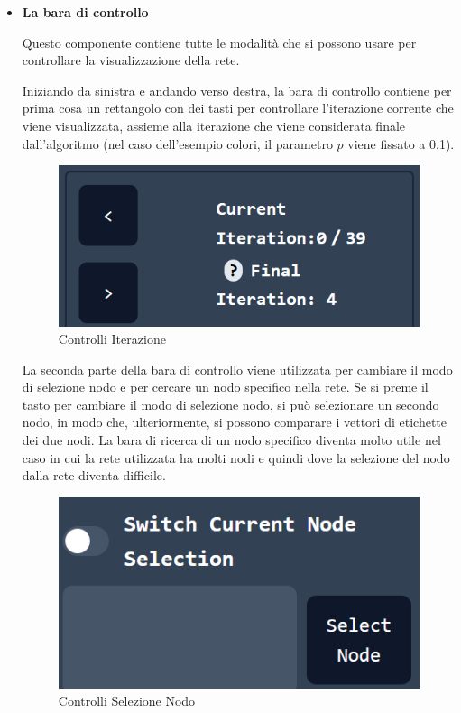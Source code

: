 \documentclass[a4paper,12pt]{report}
\begin{document}
			\begin{itemize}
			\item \textbf{La bara di controllo} 

			Questo componente contiene tutte le modalità che si possono usare per controllare la visualizzazione della rete. 

			Iniziando da sinistra e andando verso destra, la bara di controllo contiene per prima cosa un rettangolo con dei tasti per controllare l'iterazione corrente che viene visualizzata, assieme alla iterazione che viene considerata finale dall'algoritmo (nel caso dell'esempio colori, il parametro $p$ viene fissato a 0.1). 
			
			
			\begin{center}
			\begin{figure}[H]
			\centering
			\includegraphics[width=0.8\linewidth,keepaspectratio]{iterationcontrol}
			\caption{Controlli Iterazione}
			\end{figure}
			\end{center}

			La seconda parte della bara di controllo viene utilizzata per cambiare il modo di selezione nodo e per cercare un nodo specifico nella rete. Se si preme il tasto per cambiare il modo di selezione nodo, si può selezionare un secondo nodo, in modo che, ulteriormente, si possono comparare i vettori di etichette dei due nodi. La bara di ricerca di un nodo specifico diventa molto utile nel caso in cui la rete utilizzata ha molti nodi e quindi dove la selezione del nodo dalla rete diventa difficile. 
			
			\begin{center}
			\begin{figure}[H]
			\centering
			\includegraphics[width=0.8\linewidth,keepaspectratio]{nodeselection}
			\caption{Controlli Selezione Nodo}
			\end{figure}
			\end{center}


\end{itemize}
\end{document}
